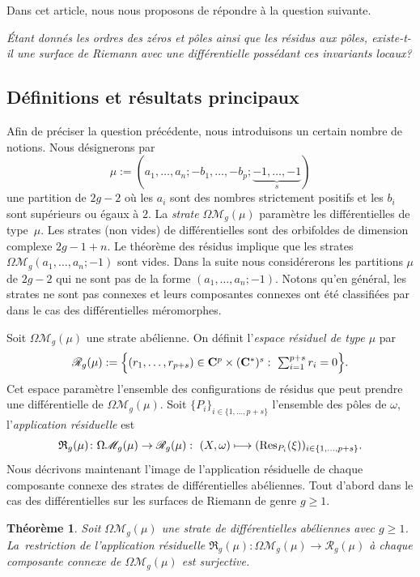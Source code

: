 \documentclass[JEP,XML,SOM,Unicode,francais,NoFloatCountersInSection,published]{cedram}
\let\mathcal\mathscr
\newcommand\mto{\mathchoice{\longmapsto}{\mapsto}{\mapsto}{\mapsto}}
\newcommand{\CC}{\mathbf{C}}
\newcommand\Res{\operatorname{Res}}
\newcommand{\appres}[1][g]{\mathfrak{R}_{#1}}
\newcommand{\espres}[1][g]{\mathcal{R}_{#1}}
\newcommand{\omoduli}[1][g]{{\Omega\mathcal M}_{\!#1}}
\newtheorem{thm}{Théorème}[section]
\theoremstyle{definition}
\begin{document}
Dans cet article, nous nous proposons de répondre à la question suivante.
\par\smallskip
\emph{Étant donnés les ordres des zéros et pôles ainsi que les résidus aux pôles, existe-t-il une surface de Riemann avec une différentielle possédant ces invariants locaux?}

\subsection{Définitions et résultats principaux}
Afin de préciser la question précédente, nous introduisons un certain nombre de notions. Nous désignerons par
\[
\mu:=(a_{1},\dots,a_{n};-b_{1},\dots,-b_{p};\underbrace{-1,\dots,-1}_{s})\] une partition de $2g-2$ où les $a_{i}$ sont des nombres strictement positifs et les $b_{i}$ sont supérieurs ou égaux à $2$.
La \emph{strate} $\omoduli(\mu)$ paramètre les différentielles de type~$\mu$. Les strates (non vides) de différentielles sont des orbifoldes de dimension complexe $2g-1+n$.
Le théorème des résidus implique que les strates $\omoduli(a_{1},\dots,a_{n};-1)$ sont vides. Dans la suite nous considérerons les partitions $\mu$ de $2g-2$ qui ne sont pas de la forme $(a_{1},\dots,a_{n};-1)$. Notons qu'en général, les strates ne sont pas connexes et leurs composantes connexes ont été classifiées par \cite{Bo} dans le cas des différentielles méromorphes.

Soit $\omoduli(\mu)$ une strate abélienne. On définit l'\emph{espace résiduel de type $\mu$} par
\begin{equation}\textstyle
\espres(\mu) := \Bigl\{ (r_{1},\dots,r_{p+s})\in \CC^{p}\times(\CC^{\ast})^{s}:\ \sum_{i=1}^{p+s} r_{i}=0 \Bigr\}.
\end{equation}
Cet espace paramètre l'ensemble des configurations de résidus que peut prendre une différentielle de $\omoduli(\mu)$.
Soit $\{P_{i}\}_{i\in\{1,\dots,p+s \}}$ l'ensemble des pôles de $\omega$, l'\emph{application résiduelle} est
\begin{equation}
\appres(\mu) \colon \omoduli(\mu) \to \espres(\mu):\ (X,\omega) \mto (\Res_{P_{i}}(\xi))_{i \in \{1,\dots,p+s\} }.
\end{equation}
Nous décrivons maintenant l'image de l'application résiduelle de chaque composante connexe des strates de différentielles abéliennes. Tout d'abord dans le cas des différentielles sur les surfaces de Riemann de genre $g\geq1$.
\begin{thm}\label{thm:ggeq1abel}
Soit $\omoduli(\mu)$ une strate de différentielles abéliennes avec $g\geq1$. La~restriction de l'application résiduelle $\appres(\mu)\colon\omoduli(\mu) \to \espres(\mu)$ à chaque composante connexe de $\omoduli(\mu)$ est surjective.
\end{thm}
\end{document}
